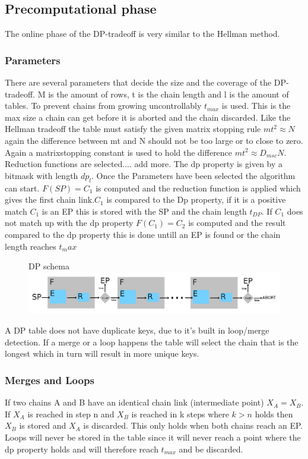 {\subsection{Precomputational phase}
The online phase of the DP-tradeoff is very similar to the Hellman method.
\subsubsection{Parameters}
There are several parameters that decide the size and the coverage of
the DP-tradeoff. M is the amount of rows, t is the chain length  and l is the amount of tables.
To prevent chains from growing uncontrollably $t_{max}$ is used. This is the max size a chain can get before it is aborted and the chain discarded.
Like the Hellman tradeoff the table must satisfy the
given matrix stopping rule $mt^2\approx N$ again the difference between
mt and N should not be too large or to close to zero. Again a
matrixstopping constant is used to hold the difference $mt^2\approx
D_{msc}N$. Reduction functions are selected.... add more. The dp property is given by a bitmask with length $dp_l$.
Once the Parameters have been selected the algorithm can start. $F(SP)=C_1$ is computed and the reduction function is applied which gives the first chain link.$C_1$ is compared to the Dp property, if it is a positive match $C_1$ is an EP this is stored with the SP and the chain length $t_{DP}$. If $C_1$ does not match up with the dp property $F(C_1)=C_2$ is computed and the result compared to the dp property this is done untill an EP is found or the chain length reaches $t_max$


\begin{figure}[th]
  DP schema
  \includegraphics[width=\textwidth]{figures/DPSchema.png}
  \centering
\end{figure}

A DP table does not have duplicate keys, due to it's built in loop/merge detection. If a merge or a loop happens the table will select the chain that is the longest which in turn will result in more unique keys.
\subsubsection{Merges and Loops}
If two chains A and B have an identical chain link (intermediate point) $X_A = X_B$. If $X_A$ is reached in step n and $X_B$ is reached in k steps where $k>n$ holds then $X_B$ is stored and $X_A$ is discarded. This only holds when both chains reach an EP. Loops will never be stored in the table since it will never reach a point where the dp property holds and will therefore reach $t_{max}$ and be discarded.

}
